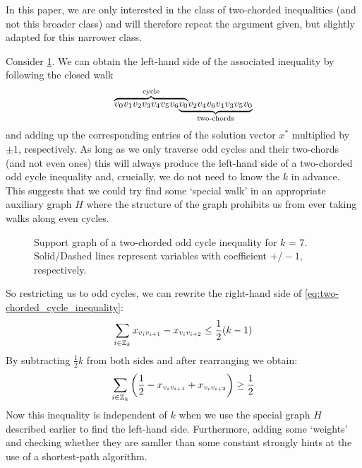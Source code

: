 In this paper, we are only interested in the class of two-chorded inequalities (and not this broader class) and will therefore repeat the argument given, but slightly adapted for this narrower class.

Consider \cref{fig:support_graph_two-chorded_odd_cycle_inequality}.
We can obtain the left-hand side of the associated inequality by following the closed walk
\[
\mathrlap{\overbrace{\phantom{v_{0} v_{1} v_{2} v_{3} v_{4} v_{5} v_{6} v_{0}}}^{\text{cycle}}}
v_{0} v_{1} v_{2} v_{3} v_{4} v_{5} v_{6}
\mathrlap{\underbrace{\phantom{v_{0} v_{2} v_{4} v_{6} v_{1} v_{3} v_{5} v_{0}}}_{\text{two-chords}}}
v_{0} v_{2} v_{4} v_{6} v_{1} v_{3} v_{5} v_{0}
\]
and adding up the corresponding entries of the solution vector $x^{*}$ multiplied by $\pm 1$, respectively.
As long as we only traverse odd cycles and their two-chords (and not even ones) this will always produce the left-hand side of a two-chorded odd cycle inequality and, crucially, we do not need to know the $k$ in advance.
This suggests that we could try find some ‘special walk’ in an appropriate auxiliary graph $H$ where the structure of the graph prohibits us from ever taking walks along even cycles.

\begin{figure}
	\centering
	\caption[Support graph of a two-chorded odd cycle inequality]{Support graph of a two-chorded odd cycle inequality for $k$ = 7.
	Solid/Dashed lines represent variables with coefficient $+ / - 1$, respectively.}
	\label{fig:support_graph_two-chorded_odd_cycle_inequality}
\end{figure}

So restricting us to odd cycles, we can rewrite the right-hand side of \cref{eq:two-chorded_cycle_inequality}:
\begin{equation*}
	\sum_{i \in \mathbb{Z}_k} x_{v_i v_{i+1}} - x_{v_i v_{i+2}} \leq \frac{1}{2} (k-1)
\end{equation*}
By subtracting $\frac{1}{2}k$ from both sides and after rearranging we obtain:
\begin{equation}\label{eq:two-chorded_graph_weights}
	\sum_{i \in \mathbb{Z}_k} \left( \frac{1}{2} -x_{v_i v_{i+1}} + x_{v_i v_{i+2}} \right) \geq \frac{1}{2}
\end{equation}
Now this inequality is independent of $k$ when we use the special graph $H$ described earlier to find the left-hand side.
Furthermore, adding some ‘weights’ and checking whether they are samller than some constant strongly hints at the use of a shortest-path algorithm.

